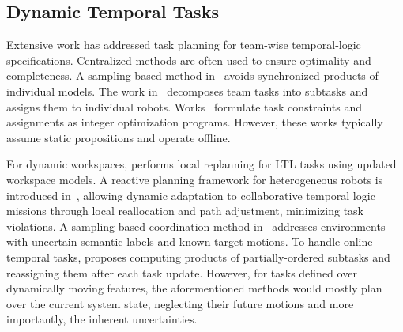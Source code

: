\subsection{Dynamic Temporal Tasks}\label{subsec:dynamic_task}
Extensive work has addressed task planning for team-wise temporal-logic specifications.
Centralized methods are often used to ensure optimality and completeness.
A sampling-based method in~\cite{kantaros2020stylus}
avoids synchronized products of individual models.
The work in~\cite{schillinger2018simultaneous}
decomposes team tasks into subtasks and assigns them to individual robots.
Works~\cite{luo2022temporal, sahin2019multirobot}
formulate task constraints and assignments
as integer optimization programs.
However, these works typically assume static propositions and operate offline.

For dynamic workspaces,
\cite{guo2015multi}
performs local replanning for LTL tasks
using updated workspace models.
A reactive planning framework for heterogeneous robots
is introduced in~\cite{Zhang2024},
allowing dynamic adaptation to collaborative temporal logic missions
through local reallocation and path adjustment,
minimizing task violations.
A sampling-based coordination method in~\cite{Sama2023}
addresses environments with uncertain semantic labels and known target motions.
To handle online temporal tasks,
\cite{liu2024fast} proposes computing products
of partially-ordered subtasks and reassigning them after each task update.
However, for tasks defined over dynamically moving features,
the aforementioned methods would mostly plan over the current system state,
neglecting their future motions and more importantly,
the inherent uncertainties.


